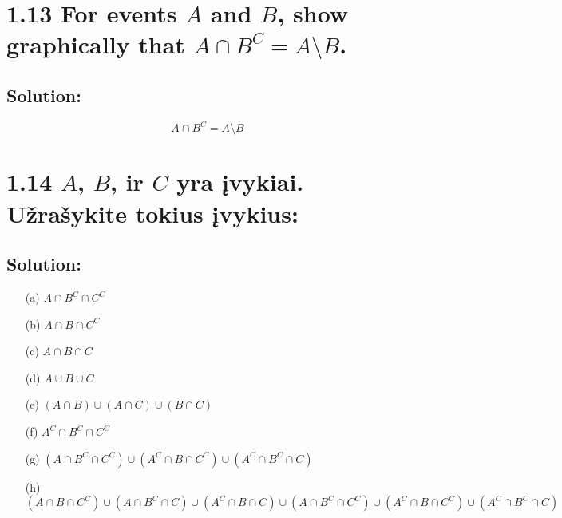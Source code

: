 \documentclass{article}
\begin{document}
\section*{1.13 For events \(A\) and \(B\), show graphically that \(A \cap B^C = A \setminus B\).}

\subsection*{Solution:}
\begin{center}
\end{center}
\[
A \cap B^C = A \setminus B
\]

\section*{1.14 \(A\), \(B\), ir \(C\) yra įvykiai. Užrašykite tokius įvykius:}

\subsection*{Solution:}
\begin{itemize}
    \item[(a)] \(A \cap B^C \cap C^C\)
    \item[(b)] \(A \cap B \cap C^C\)
    \item[(c)] \(A \cap B \cap C\)
    \item[(d)] \(A \cup B \cup C\)
    \item[(e)] \((A \cap B) \cup (A \cap C) \cup (B \cap C)\)
    \item[(f)] \(A^C \cap B^C \cap C^C\)
    \item[(g)] \((A \cap B^C \cap C^C) \cup (A^C \cap B \cap C^C) \cup (A^C \cap B^C \cap C)\)
    \item[(h)] \((A \cap B \cap C^C) \cup (A \cap B^C \cap C) \cup (A^C \cap B \cap C) \cup (A \cap B^C \cap C^C) \cup (A^C \cap B \cap C^C) \cup (A^C \cap B^C \cap C)\)
\end{itemize}
\end{document}
